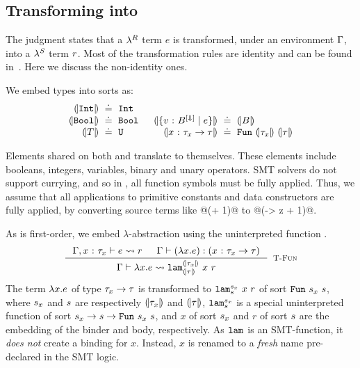 \subsection{Transforming \corelan into \smtlan}
%
\label{subsec:embedding}

The judgment
states that a $\lambda^{R}$ term $e$ is transformed,
under an environment $\Gamma$, into a
$\lambda^{\mathit{S}}$ term $r$.
%
Most of the transformation rules are identity
and can be found in~\cite{appendix}.
Here we discuss the non-identity ones.

%
We embed \corelan types into \smtlan sorts as:
%
\[\arraycolsep=1.4pt
\begin{array}{rclcrcl}
\embed{\tint}                       & \defeq &  \tint  & \quad &
                                             &         &          \\
\embed{\tbool}                      & \defeq &  \tbool & \quad &
\embed{\tref{v}{\btyp^{[\tlabel]}}{\reft}} &\defeq & \embed{\btyp}\\
\embed{T}                           & \defeq &  \tuniv & \quad &
\embed{\tfun{x}{\typ_x}{\typ}} & \defeq & \tsmtfun{\embed{\typ_x}}{\embed{\typ}}\\
\end{array}
\]


%
Elements shared on both \corelan and \smtlan
translate to themselves.
%
These elements include
booleans,
integers,
variables,
binary
and unary
operators.
%
SMT solvers do not support currying,
and so in \smtlan, all function symbols
must be fully applied.
%
Thus, we assume that all applications
to primitive constants and data
constructors are fully applied, \eg by converting
source terms like @(+ 1)@ to
@(\z -> z + 1)@.
%


%
As \smtlan is first-order, we
embed $\lambda$-abstraction
using the uninterpreted function
\smtlamname{}{}.
%
$$
\inference{
    \tologicshort{\env, \tbind{x}{\typ_x}}{e}{}{\pred}{}{}{} &
        \hastype{\env}{(\efun{x}{}{e})}{(\tfun{x}{\typ_x}{\typ})}\\
}{
	\tologicshort{\env}{\efun{x}{}{e}}{(\tfun{x}{\typ_x}{\typ})}
	        {\smtlamname{\embed{\typ_x}}{\embed{\typ}}\ {x}\ {\pred}}
	        {\sort'}{\smtenv, \tbind{f}{\sort'}}{\andaxioms{\{\axioms_{f_1}, \axioms_{f_2}\}}{\axioms}}
}[\lgfun]
$$
%
The term $\lambda x. e$ of type
${\tau_x \rightarrow \tau}$ is transformed
to
${\smtlamname{\sort_x}{\sort}\ x\ \pred}$
of sort
${\mathtt{Fun}\ {s_x}\ {s}}$, where
%
$s_x$ and $s$ are respectively
$(\!|\tau_x|\!)$ and $(\!|\tau|\!)$,
%
${\texttt{lam}^{s_x}_{s}}$
is a special uninterpreted function
of sort
${s_x \rightarrow s\rightarrow\mathtt{Fun}\ {s_x}\ {s}}$,
and
$x$ of sort $s_x$ and $r$ of sort $s$ are
the embedding of the binder and body, respectively.
%
As $\texttt{lam}^{}_{}$ is an SMT-function,
it \emph{does not} create a binding for $x$.
%
Instead, $x$ is renamed to
a \emph{fresh} name pre-declared in
the SMT logic.


